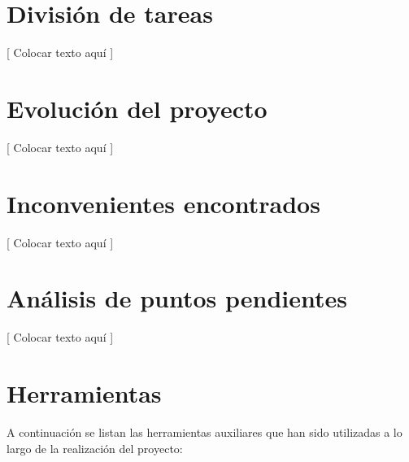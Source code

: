\documentclass{article}
\begin{document}
\section{División de tareas}

	[ Colocar texto aquí ]
\bigskip




\section{Evolución del proyecto}

	[ Colocar texto aquí ]
\bigskip




\section{Inconvenientes encontrados}

	[ Colocar texto aquí ]
\bigskip




\section{Análisis de puntos pendientes}

	[ Colocar texto aquí ]
\bigskip




\section{Herramientas}

	A continuación se listan las herramientas auxiliares que han sido utilizadas a lo largo de la realización del proyecto:
	\smallskip
\end{document}
